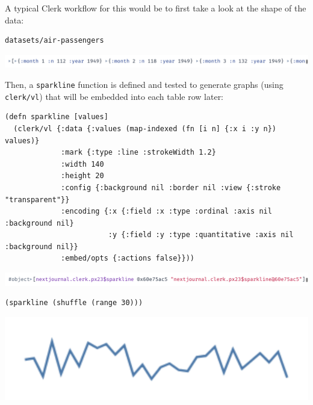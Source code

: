 \documentclass[sigconf,screen]{acmart}
\newcommand{\passthrough}[1]{#1}
\begin{document}
A typical Clerk workflow for this would be to first take a look at the shape of the data:

\begin{minipage}{\linewidth}
\begin{lstlisting}
datasets/air-passengers
\end{lstlisting}
\end{minipage}

\includegraphics{images/anon-expr-5drcDeJRcpX2uPqZi7XJch2DedHM6j-result.png}

Then, a \passthrough{\lstinline!sparkline!} function is defined and tested to generate graphs (using \passthrough{\lstinline!clerk/vl!}) that will be embedded into each table row later:

\begin{minipage}{\linewidth}
\begin{lstlisting}
(defn sparkline [values]
  (clerk/vl {:data {:values (map-indexed (fn [i n] {:x i :y n}) values)}
             :mark {:type :line :strokeWidth 1.2}
             :width 140
             :height 20
             :config {:background nil :border nil :view {:stroke "transparent"}}
             :encoding {:x {:field :x :type :ordinal :axis nil :background nil}
                        :y {:field :y :type :quantitative :axis nil :background nil}}
             :embed/opts {:actions false}}))
\end{lstlisting}
\end{minipage}

\includegraphics{images/sparkline-result.png}

\begin{minipage}{\linewidth}
\begin{lstlisting}
(sparkline (shuffle (range 30)))
\end{lstlisting}
\end{minipage}

\includegraphics{images/anon-expr-5dr3uWTA777Ny4ajSWGaWCymacQXhQ-result.png}
\end{document}
